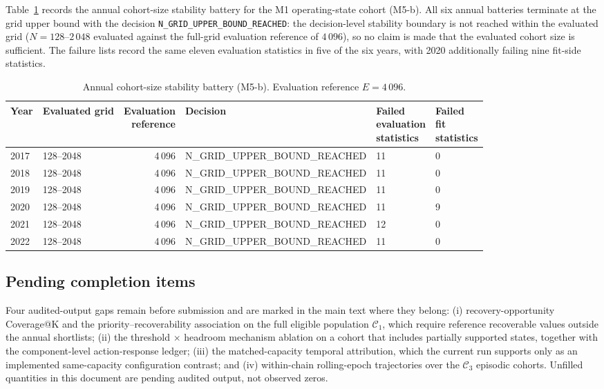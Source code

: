 \documentclass[10pt,a4paper]{article}
\numberwithin{equation}{section}
\begin{document}
Table~\ref{tab:sup_ladder} records the annual cohort-size stability battery for the M1 operating-state cohort (M5-b). All six annual batteries terminate at the grid upper bound with the decision \texttt{N\_GRID\_UPPER\_BOUND\_REACHED}: the decision-level stability boundary is not reached within the evaluated grid ($N=128$--$2\,048$ evaluated against the full-grid evaluation reference of $4\,096$), so no claim is made that the evaluated cohort size is sufficient. The failure lists record the same eleven evaluation statistics in five of the six years, with 2020 additionally failing nine fit-side statistics.
\begin{table}[htbp]\centering\footnotesize
\caption{Annual cohort-size stability battery (M5-b). Evaluation reference $E=4\,096$.}\label{tab:sup_ladder}
\begin{tabular}{llrlll}\toprule
Year & Evaluated grid & \shortstack{Evaluation\\reference} & Decision & \shortstack{Failed\\evaluation\\statistics} & \shortstack{Failed\\fit\\statistics} \\ \midrule
2017 & 128--2048 & 4\,096 & N\_GRID\_UPPER\_BOUND\_REACHED & 11 & 0 \\
2018 & 128--2048 & 4\,096 & N\_GRID\_UPPER\_BOUND\_REACHED & 11 & 0 \\
2019 & 128--2048 & 4\,096 & N\_GRID\_UPPER\_BOUND\_REACHED & 11 & 0 \\
2020 & 128--2048 & 4\,096 & N\_GRID\_UPPER\_BOUND\_REACHED & 11 & 9 \\
2021 & 128--2048 & 4\,096 & N\_GRID\_UPPER\_BOUND\_REACHED & 12 & 0 \\
2022 & 128--2048 & 4\,096 & N\_GRID\_UPPER\_BOUND\_REACHED & 11 & 0 \\
\bottomrule
\end{tabular}
\end{table}

\subsection{Pending completion items}
\label{sup:pending}
Four audited-output gaps remain before submission and are marked in the main text where they belong: (i) recovery-opportunity Coverage@K and the priority--recoverability association on the full eligible population $\mathcal C_{1}$, which require reference recoverable values outside the annual shortlists; (ii) the threshold $\times$ headroom mechanism ablation on a cohort that includes partially supported states, together with the component-level action-response ledger; (iii) the matched-capacity temporal attribution, which the current run supports only as an implemented same-capacity configuration contrast; and (iv) within-chain rolling-epoch trajectories over the $\mathcal C_3$ episodic cohorts. Unfilled quantities in this document are pending audited output, not observed zeros.
\end{document}
